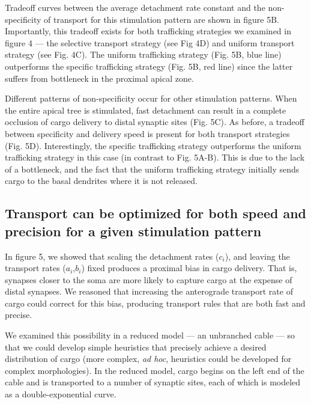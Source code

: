 \documentclass[10pt]{wlpeerj}
\begin{document}
Tradeoff curves between the average detachment rate constant and the non-specificity of transport for this stimulation pattern are shown in figure 5B.
Importantly, this tradeoff exists for both trafficking strategies we examined in figure 4 --- the selective transport strategy (see Fig 4D) and uniform transport strategy (see Fig. 4C).
The uniform trafficking strategy (Fig. 5B, blue line) outperforms the specific trafficking strategy (Fig. 5B, red line) since the latter suffers from bottleneck in the proximal apical zone.

Different patterns of non-specificity occur for other stimulation patterns.
When the entire apical tree is stimulated, fast detachment can result in a complete occlusion of cargo delivery to distal synaptic sites (Fig. 5C).
As before, a tradeoff between specificity and delivery speed is present for both transport strategies (Fig. 5D).
Interestingly, the specific trafficking strategy outperforms the uniform trafficking strategy in this case (in contrast to Fig. 5A-B).
This is due to the lack of a bottleneck, and the fact that the uniform trafficking strategy initially sends cargo to the basal dendrites where it is not released.

\subsection*{Transport can be optimized for both speed and precision for a given stimulation pattern}

In figure 5, we showed that scaling the detachment rates ($c_i$), and leaving the transport rates ($a_i$,$b_i$) fixed produces a proximal bias in cargo delivery.
That is, synapses closer to the soma are more likely to capture cargo at the expense of distal synapses.
We reasoned that increasing the anterograde transport rate of cargo could correct for this bias, producing transport rules that are both fast and precise.

We examined this possibility in a reduced model --- an unbranched cable --- so that we could develop simple heuristics that precisely achieve a desired distribution of cargo (more complex, \textit{ad hoc}, heuristics could be developed for complex morphologies).
In the reduced model, cargo begins on the left end of the cable and is transported to a number of synaptic sites, each of which is modeled as a double-exponential curve.
\end{document}
